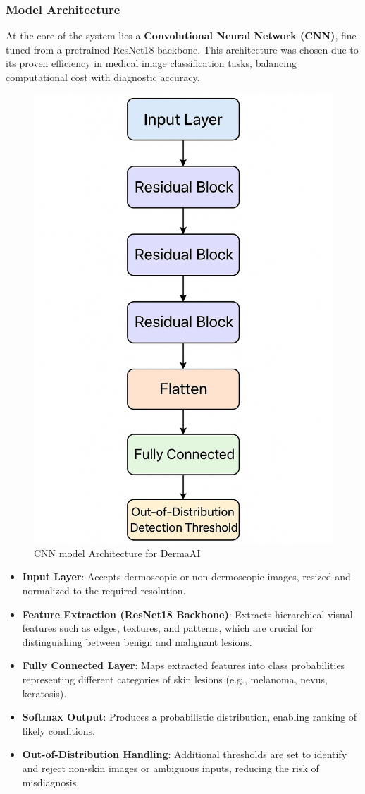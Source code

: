 \documentclass[
  12pt,
  oneside]{article}
\providecommand{\tightlist}{%
  \setlength{\itemsep}{0pt}\setlength{\parskip}{0pt}}
\begin{document}
\subsubsection{Model Architecture}\label{model-architecture-1}

At the core of the system lies a \textbf{Convolutional Neural Network
(CNN)}, fine-tuned from a pretrained ResNet18 backbone. This
architecture was chosen due to its proven efficiency in medical image
classification tasks, balancing computational cost with diagnostic
accuracy.

\begin{figure}

{\centering \includegraphics[width=0.5\linewidth]{cnn-architecture} 

}

\caption{CNN model Architecture for DermaAI}\label{fig:unnamed-chunk-17}
\end{figure}

\begin{itemize}
\tightlist
\item
  \textbf{Input Layer}: Accepts dermoscopic or non-dermoscopic images,
  resized and normalized to the required resolution.\\
\item
  \textbf{Feature Extraction (ResNet18 Backbone)}: Extracts hierarchical
  visual features such as edges, textures, and patterns, which are
  crucial for distinguishing between benign and malignant lesions.\\
\item
  \textbf{Fully Connected Layer}: Maps extracted features into class
  probabilities representing different categories of skin lesions (e.g.,
  melanoma, nevus, keratosis).\\
\item
  \textbf{Softmax Output}: Produces a probabilistic distribution,
  enabling ranking of likely conditions.\\
\item
  \textbf{Out-of-Distribution Handling}: Additional thresholds are set
  to identify and reject non-skin images or ambiguous inputs, reducing
  the risk of misdiagnosis.
\end{itemize}
\end{document}
